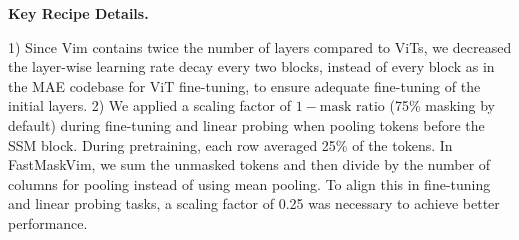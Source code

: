 \begin{table}[h]
    \caption{MAE: Linear probing setting.} 
    \begin{center}
\end{center}
    \label{tab:mae_linearprobe}
\end{table}



\noindent \textbf{Key Recipe Details.} 

1) Since Vim contains twice the number of layers compared to ViTs, we decreased the layer-wise learning rate decay every two blocks, instead of every block as in the MAE codebase for ViT fine-tuning, to ensure adequate fine-tuning of the initial layers. 2) We applied a scaling factor of \(1 - \text{mask ratio}\) (75\% masking by default) during fine-tuning and linear probing when pooling tokens before the SSM block. During pretraining, each row averaged 25\% of the tokens. In FastMaskVim, we sum the unmasked tokens and then divide by the number of columns for pooling instead of using mean pooling. To align this in fine-tuning and linear probing tasks, a scaling factor of 0.25 was necessary to achieve better performance.
\\

